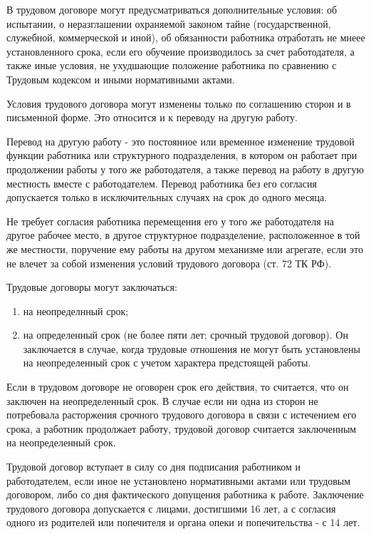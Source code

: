 В трудовом договоре могут предусматриваться дополнительные условия: об испытании, о неразглашении охраняемой законом тайне (государственной, служебной, коммерческой и иной), об обязанности работника отработать не мнеее установленного срока, если его обучение производилось за счет работодателя, а также иные условия, не ухудшающие положение работника по сравнению с Трудовым кодексом и иными нормативными актами.

Условия трудового договора могут изменены только по соглашению сторон и в письменной форме. Это относится и к переводу на другую работу.

Перевод на другую работу - это постоянное или временное изменение трудовой функции работника или структурного подразделения, в котором он работает при продолжении работы у того же работодателя, а также перевод на работу в другую местность вместе с работодателем. Перевод работника без его согласия допускается только в исключительных случаях на срок до одного месяца.

Не требует согласия работника перемещения его у того же работодателя на другое рабочее место, в другое структурное подразделение, расположенное в той же местности, поручение ему работы на другом механизме или агрегате, если это не влечет за собой изменения условий трудового договора (ст. 72 ТК РФ).

Трудовые договоры могут заключаться:

\begin{enumerate}
	\item на неопределнный срок;
	\item на определенный срок (не более пяти лет; срочный трудовой договор). Он заключается в случае, когда трудовые отношения не могут быть установлены на неопределенный срок с учетом характера предстоящей работы.
\end{enumerate}

Если в трудовом договоре не оговорен срок его действия, то считается, что он заключен на неопределенный срок. В случае если ни одна из сторон не потребовала расторжения срочного трудового договора в связи с истечением его срока, а работник продолжает работу, трудовой договор считается заключенным на неопределенный срок.

Трудовой договор вступает в силу со дня подписания работником и работодателем, если иное не установлено нормативными актами или трудовым договором, либо со дня фактического допущения работника к работе. Заключение трудового договора допускается с лицами, достигшими 16 лет, а с согласия одного из родителей или попечителя и органа опеки и попечительства - с 14 лет.

